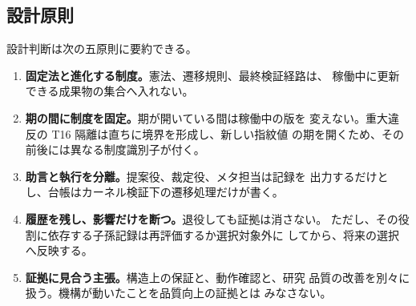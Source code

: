 \subsection{設計原則}\label{sec:overview:principles}

設計判断は次の五原則に要約できる。

\begin{enumerate}
  \item \textbf{固定法と進化する制度。}憲法、遷移規則、最終検証経路は、
        稼働中に更新できる成果物の集合へ入れない。
  \item \textbf{期の間に制度を固定。}期が開いている間は稼働中の版を
        変えない。重大違反の T16 隔離は直ちに境界を形成し、新しい指紋値
        の期を開くため、その前後には異なる制度識別子が付く。
  \item \textbf{助言と執行を分離。}提案役、裁定役、メタ担当は記録を
        出力するだけとし、台帳はカーネル検証下の遷移処理だけが書く。
  \item \textbf{履歴を残し、影響だけを断つ。}退役しても証拠は消さない。
        ただし、その役割に依存する子孫記録は再評価するか選択対象外に
        してから、将来の選択へ反映する。
  \item \textbf{証拠に見合う主張。}構造上の保証と、動作確認と、研究
        品質の改善を別々に扱う。機構が動いたことを品質向上の証拠とは
        みなさない。
\end{enumerate}
